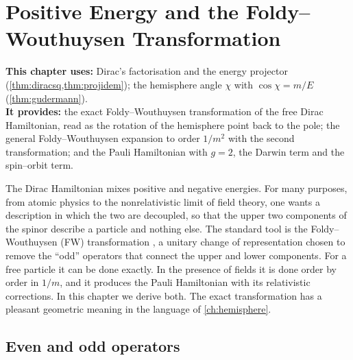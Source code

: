 \chapter[Positive Energy and the Foldy--Wouthuysen Transformation]{Positive Energy and the Foldy--Wouthuysen Transformation}
\label{ch:fw}

\begin{usesbox}
\textbf{This chapter uses:} Dirac's factorisation and the energy projector (\cref{thm:diracsq,thm:projidem}); the hemisphere angle $\chi$ with $\cos\chi=m/E$ (\cref{thm:gudermann}).\\
\textbf{It provides:} the exact Foldy--Wouthuysen transformation of the free Dirac Hamiltonian, read as the rotation of the hemisphere point back to the pole; the general Foldy--Wouthuysen expansion to order $1/m^2$ with the second transformation; and the Pauli Hamiltonian with $g=2$, the Darwin term and the spin--orbit term.
\end{usesbox}

The Dirac Hamiltonian mixes positive and negative energies. For many purposes, from atomic physics to the nonrelativistic limit of field theory, one wants a description in which the two are decoupled, so that the upper two components of the spinor describe a particle and nothing else. The standard tool is the Foldy--Wouthuysen (FW) transformation \cite{FoldyWouthuysen1950}, a unitary change of representation chosen to remove the ``odd'' operators that connect the upper and lower components. For a free particle it can be done exactly. In the presence of fields it is done order by order in $1/m$, and it produces the Pauli Hamiltonian with its relativistic corrections. In this chapter we derive both. The exact transformation has a pleasant geometric meaning in the language of \cref{ch:hemisphere}.

\section{Even and odd operators}

